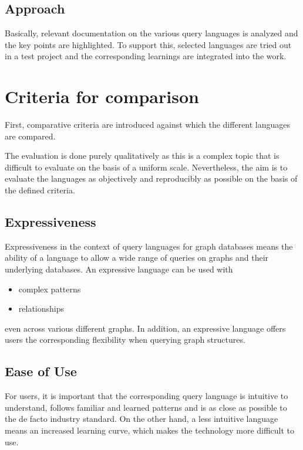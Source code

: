 \section{Approach}
\label{sec:intro:Approach}
Basically, relevant documentation on the various query languages is analyzed and the key points are highlighted. 
To support this, selected languages are tried out in a test project and the corresponding learnings are integrated into the work.


\chapter{Criteria for comparison}
First, comparative criteria are introduced against which the different languages are compared.

The evaluation is done purely qualitatively as this is a complex topic that is difficult to evaluate on the basis of a uniform scale. 
Nevertheless, the aim is to evaluate the languages as objectively and reproducibly as possible on the basis of the defined criteria.

\section{Expressiveness}
Expressiveness in the context of query languages for graph databases means the ability 
of a language to allow a wide range of queries on graphs and their underlying databases.
An expressive language can be used with
\begin{itemize}
	\item complex patterns
	\item relationships
\end{itemize}
even across various different graphs.
In addition, an expressive language offers users the corresponding flexibility
when querying graph structures.

\section{Ease of Use}
For users, it is important that the corresponding query language is intuitive to understand, follows familiar and learned patterns 
and is as close as possible to the de facto industry standard. 
On the other hand, a less intuitive language means an increased learning curve, 
which makes the technology more difficult to use.


